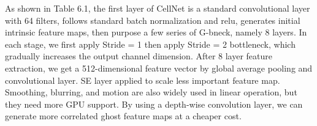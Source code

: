 {As shown in Table 6.1, the first layer of CellNet is a standard convolutional layer with 64 filters, follows standard batch normalization and relu, generates initial intrinsic feature maps, then purpose a few series of G-bneck, namely 8 layers. In each stage, we first apply Stride = 1 then apply Stride = 2 bottleneck, which gradually increases the output channel dimension. After 8 layer feature extraction, we get a 512-dimensional feature vector by global average pooling and convolutional layer. SE layer applied to scale less important feature map. Smoothing, blurring, and motion are also widely used in linear operation, but they need more GPU support. By using a depth-wise convolution layer, we can generate more correlated ghost feature maps at a cheaper cost.
\begin{table}[htbp]
\centering


\end{table}}
